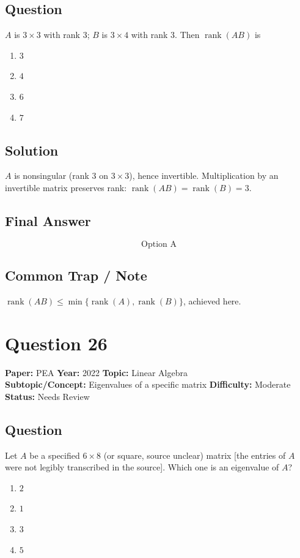 \documentclass[11pt]{article}
\begin{document}
\subsection*{Question}
$A$ is $3 \times 3$ with rank $3$; $B$ is $3 \times 4$ with rank $3$. Then $\operatorname{rank}(AB)$ is
\begin{enumerate}[label=(\Alph*)]
\item $3$
\item $4$
\item $6$
\item $7$
\end{enumerate}

\subsection*{Solution}
$A$ is nonsingular (rank $3$ on $3\times 3$), hence invertible. Multiplication by an
invertible matrix preserves rank: $\operatorname{rank}(AB) = \operatorname{rank}(B) = 3$.

\subsection*{Final Answer}
\[
\boxed{\text{Option A}}
\]

\subsection*{Common Trap / Note}
$\operatorname{rank}(AB) \leq \min\{\operatorname{rank}(A), \operatorname{rank}(B)\}$, achieved here.

\section*{Question 26}
\textbf{Paper:} PEA \quad \textbf{Year:} 2022 \quad \textbf{Topic:} Linear Algebra \\
\textbf{Subtopic/Concept:} Eigenvalues of a specific matrix \quad \textbf{Difficulty:} Moderate \\
\textbf{Status:} Needs Review

\subsection*{Question}
Let $A$ be a specified $6 \times 8$ (or square, source unclear) matrix [the entries of $A$ were
not legibly transcribed in the source]. Which one is an eigenvalue of $A$?
\begin{enumerate}[label=(\Alph*)]
\item $2$
\item $1$
\item $3$
\item $5$
\end{enumerate}
\end{document}
